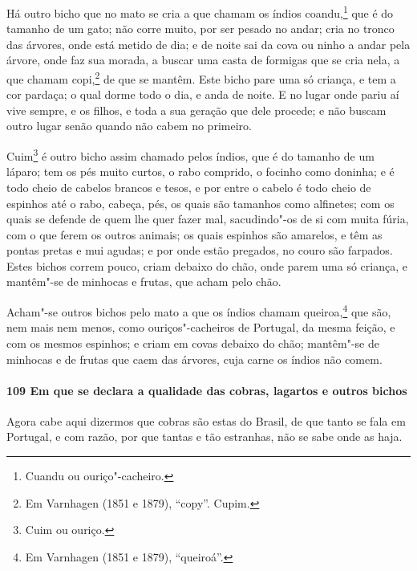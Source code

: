 \begin{linenumbers}
Há outro bicho que no mato se cria a que chamam os índios coandu,\footnote{ Cuandu ou
ouriço"-cacheiro.} que é do tamanho de um gato; não corre muito, por ser pesado no andar;
cria no tronco das árvores, onde está metido de dia; e de noite sai da cova ou ninho a
andar pela árvore, onde faz sua morada, a buscar uma casta de formigas que se cria nela, a
que chamam copi,\footnote{ Em Varnhagen (1851 e 1879), ``copy''. Cupim.} de que se mantêm.
Este bicho pare uma só criança, e tem a cor pardaça; o qual dorme todo o dia, e anda de
noite. E no lugar onde pariu aí vive sempre, e os filhos, e toda a sua geração que dele
procede; e não buscam outro lugar senão quando não cabem no primeiro.

Cuim\footnote{ Cuim ou ouriço.} é outro bicho assim chamado pelos índios, que é do tamanho
de um láparo; tem os pés muito curtos, o rabo comprido, o focinho como doninha; e é todo
cheio de cabelos brancos e tesos, e por entre o cabelo é todo cheio de espinhos até o
rabo, cabeça, pés, os quais são tamanhos como alfinetes; com os quais se defende de quem
lhe quer fazer mal, sacudindo"-os de si com muita fúria, com o que ferem os outros animais;
os quais espinhos são amarelos, e têm as pontas pretas e mui agudas; e por onde estão
pregados, no couro são farpados. Estes bichos correm pouco, criam debaixo do chão, onde
parem uma só criança, e mantêm"-se de minhocas e frutas, que acham pelo chão.

Acham"-se outros bichos pelo mato a que os índios chamam queiroa,\footnote{ Em Varnhagen
(1851 e 1879), ``queiroá''.} que são, nem mais nem menos, como ouriços"-cacheiros de
Portugal, da mesma feição, e com os mesmos espinhos; e criam em covas debaixo do chão;
mantêm"-se de minhocas e de frutas que caem das árvores, cuja carne os índios não comem.

\paragraph{109 Em que se declara a qualidade das cobras, lagartos e outros bichos}\quad
Agora cabe aqui dizermos que cobras são estas do Brasil, de que tanto se fala em Portugal,
e com razão, por que tantas e tão estranhas, não se sabe onde as haja.


\end{linenumbers}
